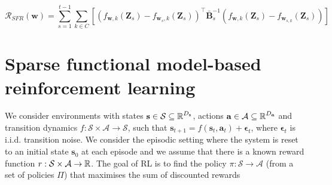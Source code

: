 \documentclass{article}
\newcommand{\state}{\ensuremath{\mathbf{s}}}
\newcommand{\action}{\ensuremath{\mathbf{a}}}
\newcommand{\noise}{\ensuremath{\bm\epsilon}}
\newcommand{\discount}{\ensuremath{\gamma}}
\newcommand{\stateDomain}{\ensuremath{\mathcal{S}}}
\newcommand{\actionDomain}{\ensuremath{\mathcal{A}}}
\newcommand{\policyDomain}{\ensuremath{\Pi}}
\newcommand{\rewardFn}{\ensuremath{r}}
\newcommand{\transitionFn}{\ensuremath{f}}
\newcommand{\policy}{\ensuremath{\pi}}
\newcommand{\mbf}[1]{\mathbf{#1}}
\newcommand{\MB}{\mbf{B}}
\newcommand{\MZ}{\mbf{Z}}
\newcommand{\T}{\top}
\newcommand{\vw}{\mbf{w}}
\begin{document}
\begin{equation}
	\mathcal{R_\textit{SFR}}(\mathbf{w}) = \sum_{s=1}^{t-1}	\sum_{k \in 	C}\left[\left(f_{\vw, k}(\MZ_{s}) - f_{\vw_{s}, k}(\MZ_s) \right)^\T \bar{\MB}^{-1}_{s} \left(f_{\vw, k}(\MZ_{s}) - f_{\vw_{s, k}}(\MZ_s) \right) \right] 
\end{equation}





\section{Sparse functional model-based reinforcement learning}
\label{app:rl}

We consider environments with states \(\state \in \stateDomain \subseteq \R^{D_{\state}} \),
actions \(\action \in \actionDomain \subseteq \R^{D_{\action}}\) and transition dynamics
\(\transitionFn: \stateDomain \times \actionDomain \rightarrow \stateDomain \), such that
$\state_{t+1} = \transitionFn(\state_{t}, \action_{t}) + \noise_{t}$, where  $\noise_{t}$
is i.i.d. transition noise.
We consider the episodic setting where the system is reset to an initial state $\state_{0}$ at each episode and we
assume that there is a known reward function $r : \stateDomain \times \actionDomain \rightarrow \R$.
The goal of RL is to find the policy \(\pi : \stateDomain \rightarrow \actionDomain\)
(from a set of policies $\Pi$) that maximises the sum of discounted rewards
\end{document}
